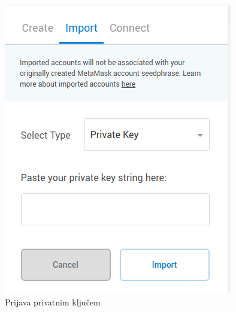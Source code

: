 \documentclass[times, utf8, zavrsni, numeric]{fer}
\begin{document}
\begin{figure}[ht]
  \centering
  \begin{minipage}[b]{0.4\textwidth}
    \includegraphics[width=\textwidth]{mmimportprivate.png}
    \caption{Prijava privatnim ključem}
  \end{minipage}
  \hfill
  \begin{minipage}[b]{0.4\textwidth}

\end{minipage}
\end{figure}
\end{document}
